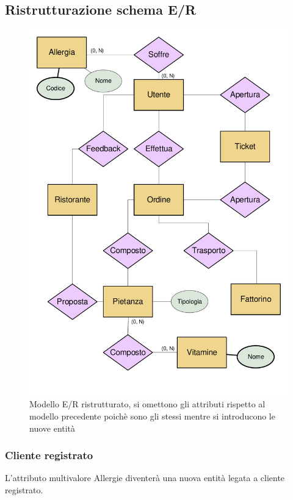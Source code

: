 \documentclass[10pt]{article}
\begin{document}
		\subsection{Ristrutturazione schema E/R}
			\begin{figure}[H]
			\begin{center}
				\hspace*{-1cm}
				\includegraphics[scale=0.54]{er_ristrutturato.pdf}
				\hspace*{-1cm}
			\end{center}
                        \caption{Modello E/R ristrutturato, si omettono gli attributi rispetto al modello precedente poichè sono gli stessi mentre si introducono le nuove entità }
		\end{figure}
			\subsubsection{Cliente registrato} 
			L'attributo multivalore Allergie\footnotemark{} diventerà una nuova entità legata a cliente registrato.
\end{document}
